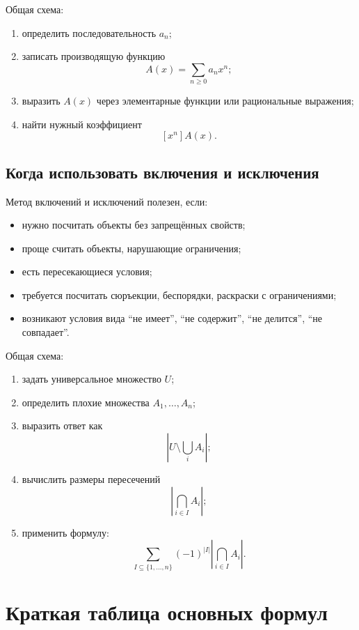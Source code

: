 \documentclass[12pt,a4paper]{article}
\begin{document}
Общая схема:
\begin{enumerate}
    \item определить последовательность $a_n$;
    \item записать производящую функцию
    \[
    A(x)=\sum_{n\ge 0}a_nx^n;
    \]
    \item выразить $A(x)$ через элементарные функции или рациональные выражения;
    \item найти нужный коэффициент
    \[
    [x^n]A(x).
    \]
\end{enumerate}

\subsection{Когда использовать включения и исключения}

Метод включений и исключений полезен, если:
\begin{itemize}
    \item нужно посчитать объекты без запрещённых свойств;
    \item проще считать объекты, нарушающие ограничения;
    \item есть пересекающиеся условия;
    \item требуется посчитать сюръекции, беспорядки, раскраски с ограничениями;
    \item возникают условия вида ``не имеет'', ``не содержит'', ``не делится'', ``не совпадает''.
\end{itemize}

Общая схема:
\begin{enumerate}
    \item задать универсальное множество $U$;
    \item определить плохие множества $A_1,\dots,A_n$;
    \item выразить ответ как
    \[
    \left|U\setminus\bigcup_i A_i\right|;
    \]
    \item вычислить размеры пересечений
    \[
    \left|\bigcap_{i\in I}A_i\right|;
    \]
    \item применить формулу:
    \[
    \sum_{I\subseteq\{1,\dots,n\}}(-1)^{|I|}
    \left|\bigcap_{i\in I}A_i\right|.
    \]
\end{enumerate}

\section{Краткая таблица основных формул}
\end{document}
